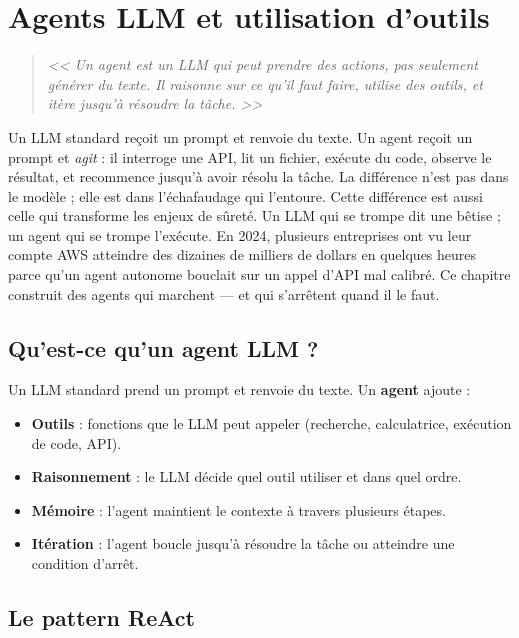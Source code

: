 \chapter{Agents LLM et utilisation d'outils}
\label{ch:agents}

\begin{quote}
\emph{<< Un agent est un LLM qui peut prendre des actions, pas seulement g\'en\'erer du texte. Il raisonne sur ce qu'il faut faire, utilise des outils, et it\`ere jusqu'\`a r\'esoudre la t\^ache. >>}
\end{quote}

Un LLM standard reçoit un prompt et renvoie du texte. Un agent reçoit un prompt et \emph{agit} : il interroge une API, lit un fichier, exécute du code, observe le résultat, et recommence jusqu'à avoir résolu la tâche. La différence n'est pas dans le modèle ; elle est dans l'échafaudage qui l'entoure. Cette différence est aussi celle qui transforme les enjeux de sûreté. Un LLM qui se trompe dit une bêtise ; un agent qui se trompe l'exécute. En 2024, plusieurs entreprises ont vu leur compte AWS atteindre des dizaines de milliers de dollars en quelques heures parce qu'un agent autonome bouclait sur un appel d'API mal calibré. Ce chapitre construit des agents qui marchent --- et qui s'arrêtent quand il le faut.
\section{Qu'est-ce qu'un agent LLM ?}

Un LLM standard prend un prompt et renvoie du texte. Un \textbf{agent} ajoute :
\begin{itemize}
  \item \textbf{Outils} : fonctions que le LLM peut appeler (recherche, calculatrice, ex\'ecution de code, API).
  \item \textbf{Raisonnement} : le LLM d\'ecide quel outil utiliser et dans quel ordre.
  \item \textbf{M\'emoire} : l'agent maintient le contexte \`a travers plusieurs \'etapes.
  \item \textbf{It\'eration} : l'agent boucle jusqu'\`a r\'esoudre la t\^ache ou atteindre une condition d'arr\^et.
\end{itemize}

\section{Le pattern ReAct}

